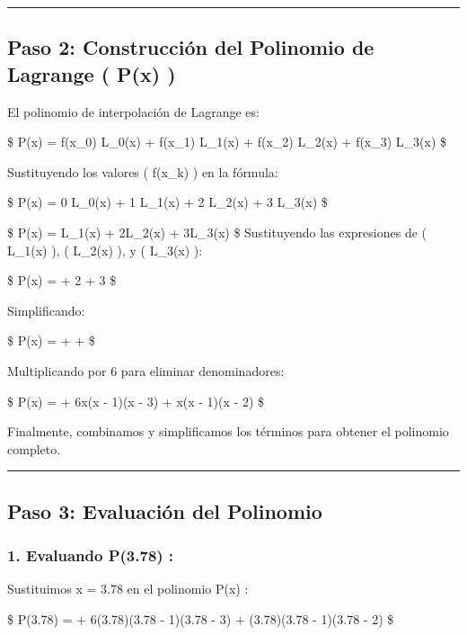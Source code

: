 \documentclass[
  letterpaper,
  DIV=11,
  numbers=noendperiod]{scrartcl}
\begin{document}
\begin{center}\rule{0.5\linewidth}{0.5pt}\end{center}

\subsection{Paso 2: Construcción del Polinomio de Lagrange ( P(x)
)}\label{paso-2-construcciuxf3n-del-polinomio-de-lagrange-px}

El polinomio de interpolación de Lagrange es:

\$ P(x) = f(x\_0) L\_0(x) + f(x\_1) L\_1(x) + f(x\_2) L\_2(x) + f(x\_3)
L\_3(x) \$

Sustituyendo los valores ( f(x\_k) ) en la fórmula:

\$ P(x) = 0 \cdot L\_0(x) + 1 \cdot L\_1(x) + 2 \cdot L\_2(x) + 3
\cdot L\_3(x) \$

\$ P(x) = L\_1(x) + 2L\_2(x) + 3L\_3(x) \$ Sustituyendo las expresiones
de ( L\_1(x) ), ( L\_2(x) ), y ( L\_3(x) ):

\$ P(x) =  + 2 \cdot {}
+ 3 \cdot {} \$

Simplificando:

\$ P(x) =  +  +
 \$

Multiplicando por 6 para eliminar denominadores:

\$ P(x) =  + 6x(x - 1)(x - 3) + x(x - 1)(x -
2) \$

Finalmente, combinamos y simplificamos los términos para obtener el
polinomio completo.

\begin{center}\rule{0.5\linewidth}{0.5pt}\end{center}

\subsection{Paso 3: Evaluación del
Polinomio}\label{paso-3-evaluaciuxf3n-del-polinomio}

\subsubsection{1. Evaluando P(3.78) :}\label{evaluando-p3.78}

Sustituimos x = 3.78 en el polinomio P(x) :

\$ P(3.78) =  + 6(3.78)(3.78 -
1)(3.78 - 3) + (3.78)(3.78 - 1)(3.78 - 2) \$
\end{document}
